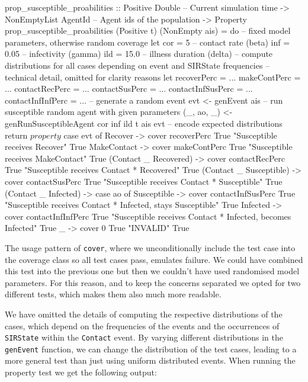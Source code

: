 \begin{HaskellCode}
prop_susceptible_proabilities :: Positive Double      -- Current simulation time
                              -> NonEmptyList AgentId -- Agent ids of the population
                              -> Property
prop_susceptible_proabilities (Positive t) (NonEmpty ais) = do
  -- fixed model parameters, otherwise random coverage
  let cor = 5     -- contact rate (beta)
      inf = 0.05  -- infectivity (gamma)
      ild = 15.0  -- illness duration (delta)
  -- compute distributions for all cases depending on event and SIRState frequencies
  -- technical detail, omitted for clarity reasons
  let recoverPerc       = ...
      makeContPerc      = ...
      contactRecPerc    = ...
      contactSusPerc    = ...
      contactInfSusPerc = ...
      contactInfInfPerc = ...
  -- generate a random event
  evt <- genEvent ais
  -- run susceptible random agent with given parameters
  (_, ao, _) <- genRunSusceptibleAgent cor inf ild t ais evt
  -- encode expected distributions
  return $ property $ case evt of 
    Recover -> 
      cover recoverPerc True "Susceptible receives Recover" True
    MakeContact -> 
      cover makeContPerc True "Susceptible receives MakeContact" True
    (Contact _ Recovered) -> 
      cover contactRecPerc True "Susceptible receives Contact * Recovered" True
    (Contact _ Susceptible) -> 
      cover contactSusPerc True "Susceptible receives Contact * Susceptible" True
    (Contact _ Infected) -> 
      case ao of
        Susceptible ->
          cover contactInfSusPerc True 
            "Susceptible receives Contact * Infected, stays Susceptible" True
        Infected ->
          cover contactInfInfPerc True 
            "Susceptible receives Contact * Infected, becomes Infected" True
        _ ->
          cover 0 True "INVALID" True
\end{HaskellCode}

The usage pattern of \texttt{cover}, where we unconditionally include the test case into the coverage class so all test cases pass, emulates failure. We could have combined this test into the previous one but then we couldn't have used randomised model parameters. For this reason, and to keep the concerns separated we opted for two different tests, which makes them also much more readable. 

We have omitted the details of computing the respective distributions of the cases, which depend on the frequencies of the events and the occurrences of \texttt{SIRState} within the \texttt{Contact} event. By varying different distributions in the \texttt{genEvent} function, we can change the distribution of the test cases, leading to a more general test than just using uniform distributed events. When running the property test we get the following output:

